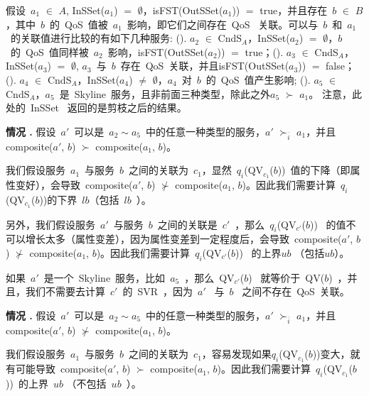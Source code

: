 假设~$a_{1}$ $\in$ $A$, InSSet($a_{1}$) $=$ $\emptyset$，isFST(OutSSet($a_{1}$)) $=$ true，并且存在~$b$ $\in$ $B$，其中~$b$~的~QoS~值被~$a_{1}$~影响，即它们之间存在~QoS~ 关联。可以与~$b$~和~$a_{1}$~的关联值进行比较的有如下几种服务: (). $a_{2}$ $\in$ CndS$_{A}$，InSSet($a_{2}$) $=$ $\emptyset$，$b$~的~QoS~值同样被~$a_{2}$~影响，isFST(OutSSet($a_{2}$)) $=$ true；(). $a_{3}$ $\in$ CndS$_{A}$，InSSet($a_{3}$) $=$ $\emptyset$, $a_{3}$~与~$b$~存在~QoS~关联，并且isFST(OutSSet($a_{3}$)) $=$ false；(). $a_{4}$ $\in$ CndS$_{A}$，InSSet($a_{4}$) $\neq$ $\emptyset$，$a_{4}$~对~$b$~的~QoS~值产生影响; (). $a_{5}$ $\in$ CndS$_{A}$，$a_{5}$~是~Skyline~服务，且非前面三种类型，除此之外$a_{5}$ $\succ$ $a_{1}$。 注意，此处的~InSSet~ 返回的是剪枝之后的结果。

\vspace{1.5pt}
\textbf{情况 \uppercase\expandafter{}.} 假设~$a'$~可以是~$a_{2} \sim a_{5}$~中的任意一种类型的服务，$a'$ $\succ_{\overline{i}}$ $a_{1}$，并且composite($a'$, $b$) $\succ$ composite($a_{1}$, $b$)。
\vspace{1.5pt}

我们假设服务~$a_{1}$~与服务~$b$~之间的关联为~$c_{1}$，显然~$q_{i}$(QV$_{c_{1}}$($b$))~值的下降（即属性变好），会导致~composite($a'$, $b$) $\nsucc$ composite($a_{1}$, $b$)。因此我们需要计算~$q_{i}$(QV$_{c_{1}}$($b$))的下界~$lb$（包括~$lb$~）。

另外，我们假设服务~$a'$~与服务~$b$~之间的关联是~$c'$~，那么~$q_{i}$(QV$_{c'}$($b$))~ 的值不可以增长太多（属性变差），因为属性变差到一定程度后，会导致~composite($a'$, $b$) $\nsucc$ composite($a_{1}$, $b$)。因此我们需要计算~$q_{i}$(QV$_{c'}$($b$))~ 的上界$ub$ （包括$ub$）。

如果~$a'$~是一个~Skyline~服务，比如~$a_{5}$~，那么~QV$_{c'}$($b$)~ 就等价于~QV($b$)~，并且，我们不需要去计算~$c'$~的~SVR~，因为~$a'$~ 与~$b$~ 之间不存在~QoS~关联。

\vspace{1.5pt}
\textbf{情况 \uppercase\expandafter{}.} 假设~$a'$~可以是~$a_{2} \sim a_{5}$~中的任意一种类型的服务，$a'$ $\succ_{\overline{i}}$ $a_{1}$，并且composite($a'$, $b$) $\nsucc$ composite($a_{1}$, $b$)。
\vspace{1.5pt}

我们假设服务~$a_{1}$~与服务~$b$~之间的关联为~$c_{1}$，容易发现如果$q_{i}$(QV$_{c_{1}}$($b$))变大，就有可能导致~composite($a'$, $b$) $\succ$ composite($a_{1}$, $b$)。因此我们需要计算~$q_{i}$(QV$_{c_{1}}$($b$))~的上界~$ub$ （不包括~$ub$~）。

